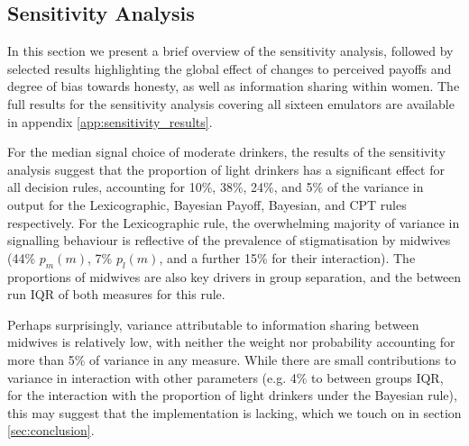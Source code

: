 \subsection{Sensitivity Analysis}
\label{sub:sa_results}

In this section we present a brief overview of the sensitivity analysis, followed by selected results highlighting the global effect of changes to perceived payoffs and degree of bias towards honesty, as well as information sharing within women. The full results for the sensitivity analysis covering all sixteen emulators are available in appendix \ref{app:sensitivity_results}.

For the median signal choice of moderate drinkers, the results of the sensitivity analysis suggest that the proportion of light drinkers has a significant effect for all decision rules, accounting for 10\%, 38\%, 24\%, and 5\% of the variance in output for the Lexicographic, Bayesian Payoff, Bayesian, and \ac{CPT} rules respectively. For the Lexicographic rule, the overwhelming majority of variance in signalling behaviour is reflective of the prevalence of stigmatisation by midwives (44\% \(p_{m}(m)\), 7\% \(p_{l}(m)\), and a further 15\% for their interaction).  The proportions of midwives are also key drivers in group separation, and the between run IQR of both measures for this rule. 

Perhaps surprisingly, variance attributable to information sharing between midwives is relatively low, with neither the weight nor probability accounting for more than 5\% of variance in any measure. While there are small contributions to variance in interaction with other parameters (e.g. 4\% to between groups IQR, for the interaction with the proportion of light drinkers under the Bayesian rule), this may suggest that the implementation is lacking, which we touch on in section \ref{sec:conclusion}.

